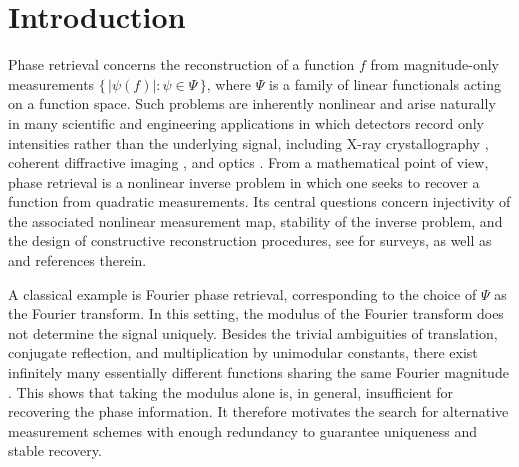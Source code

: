 \documentclass[11pt, reqno]{amsart}
\numberwithin{equation}{section}
\begin{document}
\section{Introduction}
		
\medskip 

Phase retrieval concerns the reconstruction of a function $f$ from magnitude-only measurements $\{\, |\psi(f)| : \psi \in \Psi \,\}$, where $\Psi$ is a family of linear functionals acting on a function space. Such problems are inherently nonlinear and arise naturally in many scientific and engineering applications in which detectors record only intensities rather than the underlying signal, including X-ray crystallography \cite{millane1990phase}, coherent diffractive imaging \cite{bunk2007diffractive}, and optics \cite{walther1963question}. From a mathematical point of view, phase retrieval is a nonlinear inverse problem in which one seeks to recover a function from quadratic measurements. Its central questions concern injectivity of the associated nonlinear measurement map, stability of the inverse problem, and the design of constructive reconstruction procedures, see \cite{fannjiang2020numerics,grohs2020phase} for surveys, as well as \cite{alaifari2017phase,alaifari2021gabor,alaifari2021uniqueness,balan2006signal,cahill2016phase,chen2022phase,cheng2019phaseless,grochenig2020phase,grohs2024stable,grohs2019stable,thakur2011reconstruction} and  references therein.



A classical example is Fourier phase retrieval, corresponding to the choice of $\Psi$ as the Fourier transform. In this setting, the modulus of the Fourier transform does not determine the signal uniquely. Besides the trivial ambiguities of translation, conjugate reflection, and multiplication by unimodular constants, there exist infinitely many essentially different functions sharing the same Fourier magnitude \cite{akutowicz1956determination,beinert2015ambiguities,hurt1989phase,walther1963question}. This shows that taking the modulus alone is, in general, insufficient for recovering the phase information. It therefore motivates the search for alternative measurement schemes with enough redundancy to guarantee uniqueness and stable recovery.
\end{document}
